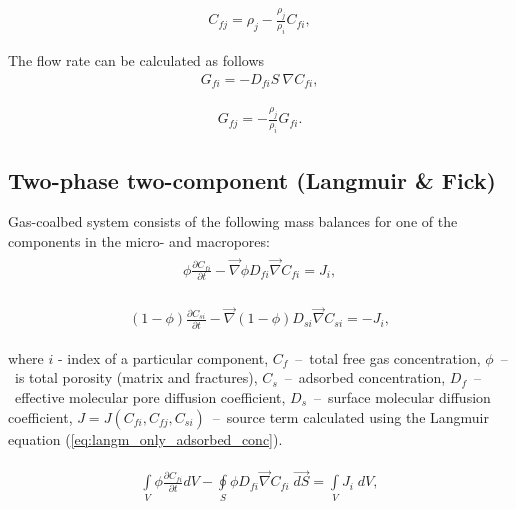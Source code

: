 \documentclass[a4paper,14pt,english]{extreport}
\begin{document}
\begin{eqnarray}
\label{eq:langm_only_diffusivity_densities}
C_{fj} =\rho_j -  \frac{\rho_j}{\rho_i}C_{fi},
\end{eqnarray} 

The flow rate can be calculated as follows
\begin{eqnarray}
\label{eq:langm_only_flow_rate_i}
G_{fi} = - D_{fi}S \:\nabla C_{fi},
\end{eqnarray} 

\begin{eqnarray}
\label{eq:langm_only_flow_rate_j}
G_{fj} = -  \frac{\rho_j}{\rho_i}G_{fi}.
\end{eqnarray} 

\subsection*{Two-phase two-component (Langmuir \& Fick)}
Gas-coalbed system consists of the following mass balances for one of the components in the micro- and macropores:
\begin{eqnarray}
\begin{gathered}
\label{eq:multiphase_free_diffusivity_differential}
\phi \frac{\partial C_{fi}}{\partial t}  - \vec{\nabla} \phi D_{fi} \vec{\nabla}C_{fi} = J_i,
\end{gathered}
\end{eqnarray}

\begin{eqnarray}
\begin{gathered}
\label{eq:multiphase_adsorbed_diffusivity_differential}
\left(\mathit{1}-\phi\right) \frac{\partial C_{si}}{\partial t}  - \vec{\nabla} \left(\mathit{1}-\phi\right) D_{si} \vec{\nabla}C_{si} = -J_i,
\end{gathered}
\end{eqnarray}

where $i$ - index of  a particular component, $C_{f}$~--~total free gas concentration, $\phi$~--~is total porosity (matrix and fractures), $C_{s}$~--~adsorbed concentration, $D_{f}$~--~effective molecular pore diffusion coefficient, $D_{s}$~--~surface molecular diffusion coefficient, $J=J\left(C_{fi}, C_{fj}, C_{si} \right)$~--~source term calculated using the Langmuir equation (\ref{eq:langm_only_adsorbed_conc}).

\begin{eqnarray}
\begin{gathered}
\label{eq:multiphase_free_diffusivity_integral}
\int \limits_{V} \phi \frac{\partial C_{fi}}{\partial t} dV  - \oint \limits_{S} \phi D_{fi} \vec{\nabla}C_{fi} \; \vec{dS} = \int \limits_{V} J_i \; dV,
\end{gathered}
\end{eqnarray}
\end{document}
